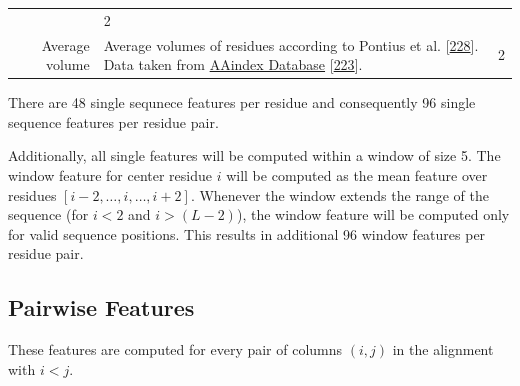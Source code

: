 \documentclass[11pt,a4paper,twoside]{book}
\theoremstyle{definition}
\theoremstyle{definition}
\theoremstyle{remark}
\begin{document}
\begin{longtable}[]{@{}rlc@{}}
\begin{minipage}[t]{0.50\columnwidth}
\end{minipage} & \begin{minipage}[t]{0.18\columnwidth}\centering\strut
2\strut
\end{minipage}\tabularnewline
\begin{minipage}[t]{0.23\columnwidth}\raggedleft\strut
Average volume\strut
\end{minipage} & \begin{minipage}[t]{0.50\columnwidth}\raggedright\strut
Average volumes of residues according to Pontius et al.
{[}\protect\hyperlink{ref-Pontius1996}{228}{]}. Data taken from
\href{http://www.genome.jp/dbget-bin/www_bget?aaindex:PONJ960101}{AAindex
Database} {[}\protect\hyperlink{ref-Kawashima2008}{223}{]}.\strut
\end{minipage} & \begin{minipage}[t]{0.18\columnwidth}\centering\strut
2\strut
\end{minipage}\tabularnewline
\bottomrule
\end{longtable}

There are 48 single sequnece features per residue and consequently 96
single sequence features per residue pair.

Additionally, all single features will be computed within a window of
size 5. The window feature for center residue \(i\) will be computed as
the mean feature over residues
\([i\!-\!2, \ldots, i, \ldots, i\!+\!2]\). Whenever the window extends
the range of the sequence (for \(i\!<\!2\) and \(i\!>\!(L-2)\)), the
window feature will be computed only for valid sequence positions. This
results in additional 96 window features per residue pair.

\subsection{Pairwise Features}\label{seq-features-pairwise}

These features are computed for every pair of columns \((i, j)\) in the
alignment with \(i<j\).
\end{document}
